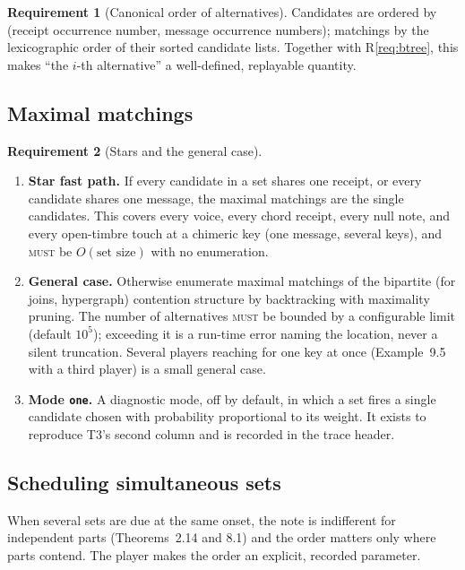 \documentclass[11pt,a4paper]{article}
\theoremstyle{definition}
\newtheorem{requirement}{Requirement}[section]
\theoremstyle{remark}
\newcommand{\MUST}{\textsc{must}}
\begin{document}
\begin{requirement}[Canonical order of alternatives]\label{req:canon}
Candidates are ordered by (receipt occurrence number, message occurrence
numbers); matchings by the lexicographic order of their sorted candidate lists.
Together with R\ref{req:btree}, this makes ``the $i$-th alternative'' a
well-defined, replayable quantity.
\end{requirement}

\subsection{Maximal matchings}

\begin{requirement}[Stars and the general case]\label{req:matchings}
\begin{enumerate}[label=(\roman*),itemsep=1pt]
\item \textbf{Star fast path.} If every candidate in a set shares one receipt,
  or every candidate shares one message, the maximal matchings are the single
  candidates. This covers every voice, every chord receipt, every null note, and
  every open-timbre touch at a chimeric key (one message, several keys), and
  \MUST{} be $O(\text{set size})$ with no enumeration.
\item \textbf{General case.} Otherwise enumerate maximal matchings of the
  bipartite (for joins, hypergraph) contention structure by backtracking with
  maximality pruning. The number of alternatives \MUST{} be bounded by a
  configurable limit (default $10^5$); exceeding it is a run-time error naming
  the location, never a silent truncation. Several players reaching for one key
  at once (Example~9.5 with a third player) is a small general case.
\item \textbf{Mode \texttt{one}.} A diagnostic mode, off by default, in which
  a set fires a single candidate chosen with probability proportional to its
  weight. It exists to reproduce T3's second column and is recorded in the
  trace header.
\end{enumerate}
\end{requirement}

\subsection{Scheduling simultaneous sets}\label{ssec:sched}

When several sets are due at the same onset, the note is indifferent for
independent parts (Theorems~2.14 and 8.1) and the order matters only where
parts contend. The player makes the order an explicit, recorded parameter.
\end{document}
